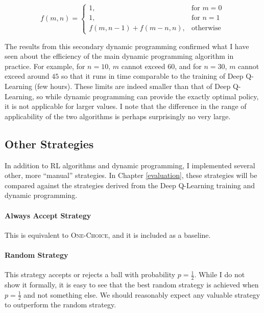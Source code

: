 \begin{equation} \label{eq: numberofpartitions}
    f(m, n) = \begin{cases}
        1, & \text{for } m=0\\
        1, & \text{for } n=1\\
        f(m,n-1)+f(m-n,n), & \text{otherwise }
    \end{cases}
\end{equation}




The results from this secondary dynamic programming confirmed what I have seen about the efficiency of the main dynamic programming algorithm in practice. For example, for $n=10$, $m$ cannot exceed $60$, and for $n=30$, $m$ cannot exceed around $45$ so that it runs in time comparable to the training of Deep Q-Learning (few hours). These limits are indeed smaller than that of Deep Q-Learning, so while dynamic programming can provide the exactly optimal policy, it is not applicable for larger values. I note that the difference in the range of applicability of the two algorithms is perhaps surprisingly no very large. 


\subsection{Other Strategies}

In addition to RL algorithms and dynamic programming, I implemented several other, more ``manual'' strategies. In Chapter \ref{evaluation}, these strategies will be compared against the strategies derived from the Deep Q-Learning training and dynamic programming.


\paragraph{Always Accept Strategy}
This is equivalent to \textsc{One-Choice}, and it is included as a baseline.


\paragraph{Random Strategy}
This strategy accepts or rejects a ball with probability $p=\frac{1}{2}$. While I do not show it formally, it is easy to see that the best random strategy is achieved when $p=\frac{1}{2}$ and not something else.  We should reasonably expect any valuable strategy to outperform the random strategy.


